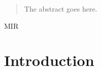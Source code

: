 \documentclass[journal,onecolumn]{IEEEtran}
\begin{document}







\maketitle

\begin{abstract}
The abstract goes here.
\end{abstract}

\begin{IEEEkeywords}
MIR
\end{IEEEkeywords}






%
\IEEEpeerreviewmaketitle



\section{Introduction}

% 
% 
% 
% 
\end{document}
